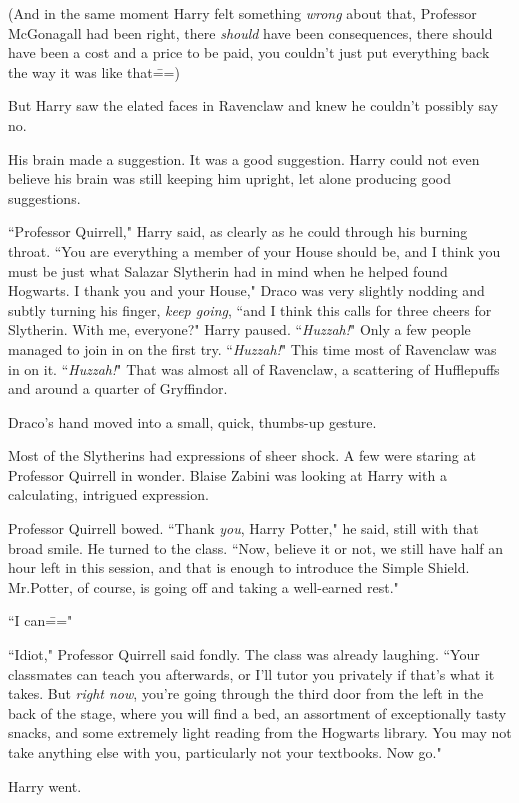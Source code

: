 (And in the same moment Harry felt something \emph{wrong} about that, Professor McGonagall had been right, there \emph{should} have been consequences, there should have been a cost and a price to be paid, you couldn't just put everything back the way it was like that\===)

But Harry saw the elated faces in Ravenclaw and knew he couldn't possibly say no.

His brain made a suggestion. It was a good suggestion. Harry could not even believe his brain was still keeping him upright, let alone producing good suggestions.

``Professor Quirrell," Harry said, as clearly as he could through his burning throat. ``You are everything a member of your House should be, and I think you must be just what Salazar Slytherin had in mind when he helped found Hogwarts. I thank you and your House," Draco was very slightly nodding and subtly turning his finger, \emph{keep going}, ``and I think this calls for three cheers for Slytherin. With me, everyone?" Harry paused. ``\emph{Huzzah!}" Only a few people managed to join in on the first try. ``\emph{Huzzah!}" This time most of Ravenclaw was in on it. ``\emph{Huzzah!}" That was almost all of Ravenclaw, a scattering of Hufflepuffs and around a quarter of Gryffindor.

Draco's hand moved into a small, quick, thumbs-up gesture.

Most of the Slytherins had expressions of sheer shock. A few were staring at Professor Quirrell in wonder. Blaise Zabini was looking at Harry with a calculating, intrigued expression.

Professor Quirrell bowed. ``Thank \emph{you}, Harry Potter," he said, still with that broad smile. He turned to the class. ``Now, believe it or not, we still have half an hour left in this session, and that is enough to introduce the Simple Shield. Mr.\?Potter, of course, is going off and taking a well-earned rest."

``I can\==="

``Idiot," Professor Quirrell said fondly. The class was already laughing. ``Your classmates can teach you afterwards, or I'll tutor you privately if that's what it takes. But \emph{right now}, you're going through the third door from the left in the back of the stage, where you will find a bed, an assortment of exceptionally tasty snacks, and some extremely light reading from the Hogwarts library. You may not take anything else with you, particularly not your textbooks. Now go."

Harry went.

